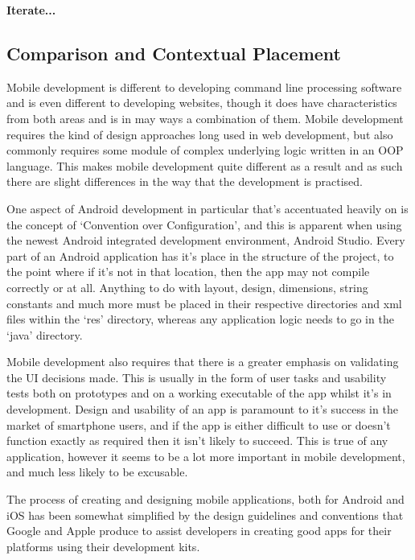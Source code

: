 \documentclass[11pt,english,numbers=endperiod,parskip=half]{scrartcl}
\begin{document}
    \textbf{Iterate...}

  \subsection{Comparison and Contextual Placement}
    Mobile development is different to developing command line processing
    software and is even different to developing websites, though it does have
    characteristics from both areas and is in may ways a combination of them.
    Mobile development requires the kind of design approaches long used in web
    development, but also commonly requires some module of complex underlying
    logic written in an OOP language. This makes mobile development quite different
    as a result and as such there are slight differences in the way that the
    development is practised.

    One aspect of Android development in particular that's accentuated heavily
    on is the concept of `Convention over Configuration', and this is apparent
    when using the newest Android integrated development environment, Android
    Studio. Every part of an Android application has it's place in the
    structure of the project, to the point where if it's not in that location,
    then the app may not compile correctly or at all. Anything to do with
    layout, design, dimensions, string constants and much more must be placed
    in their respective directories and xml files within the `res' directory,
    whereas any application logic needs to go in the `java' directory.

    Mobile development also requires that there is a greater emphasis on
    validating the UI decisions made. This is usually in the form of user tasks
    and usability tests both on prototypes and on a working executable of the
    app whilst it's in development. Design and usability of an app is paramount
    to it's success in the market of smartphone users, and if the app is either
    difficult to use or doesn't function exactly as required then it isn't
    likely to succeed. This is true of any application, however it seems to be
    a lot more important in mobile development, and much less likely to be
    excusable.

    The process of creating and designing mobile applications, both for Android
    and iOS has been somewhat simplified by the design guidelines and
    conventions that Google and Apple produce to assist developers in creating
    good apps for their platforms using their development kits.
\end{document}
